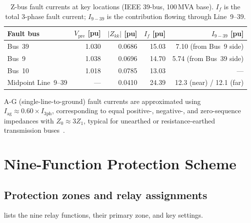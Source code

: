 \documentclass[12pt,a4paper]{article}
\begin{document}
\begin{table}[H]
\centering
\caption{Z-bus fault currents at key locations (IEEE 39-bus, 100\,MVA base).
  $I_f$ is the total 3-phase fault current; $I_{9-39}$ is the contribution
  flowing through Line~9--39.}
\label{tab:fault_currents}
\setlength{\tabcolsep}{7pt}
\begin{tabular}{lrrrr}
\toprule
Fault bus & $V_{\mathrm{pre}}$ [pu] & $|Z_{kk}|$ [pu] & $I_f$ [pu] & $I_{9-39}$ [pu] \\
\midrule
Bus~39  & 1.030 & 0.0686 & 15.03 & 7.10 (from Bus~9 side) \\
Bus~9   & 1.038 & 0.0696 & 14.70 & 5.74 (from Bus~39 side) \\
Bus~10  & 1.018 & 0.0785 & 13.03 & --- \\
Midpoint Line~9--39 & --- & 0.0410 & 24.39 & 12.3 (near) / 12.1 (far) \\
\bottomrule
\end{tabular}
\end{table}

A-G (single-line-to-ground) fault currents are approximated using
$I_{\mathrm{ag}} \approx 0.60 \times I_{\mathrm{3ph}}$, corresponding to
equal positive-, negative-, and zero-sequence impedances with
$Z_0 \approx 3Z_1$, typical for unearthed or resistance-earthed
transmission buses~\citep{Anderson1999}.

\section{Nine-Function Protection Scheme}
\label{sec:functions}

\subsection{Protection zones and relay assignments}
\label{sec:zones}

 lists the nine relay functions, their primary zone,
and key settings.
\end{document}
